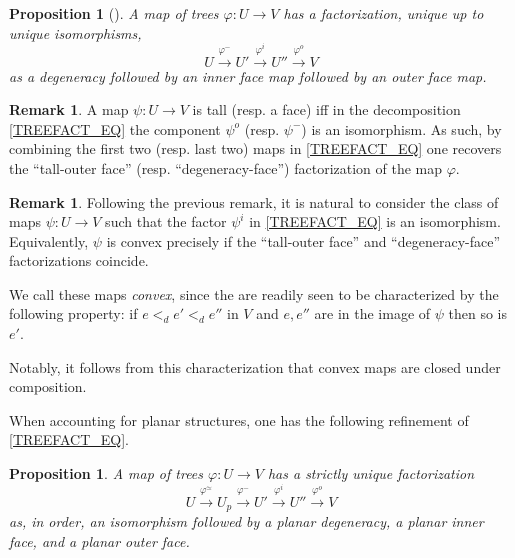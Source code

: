 \documentclass[a4paper,10pt
,draft
]{article}%
\numberwithin{equation}{section}
\numberwithin{figure}{section}
\newtheorem{proposition}[equation]{Proposition}%
\theoremstyle{definition} %
\newtheorem{remark}[equation]{Remark}%
\newcommand{\1}{\ensuremath{\mathbbm 1}}%
\begin{document}
\begin{proposition}[{\cite[Prop. 2.2]{BP_edss}}]
      \label{TREEFACT_PROP}
	A map of trees $\varphi \colon U \to V$ has a factorization, unique up to unique isomorphisms,
\begin{equation}\label{TREEFACT_EQ}
	U \xrightarrow{\varphi^-} 
	U' \xrightarrow{\varphi^i} 
	U'' \xrightarrow{\varphi^o} V
\end{equation}
	as a degeneracy followed by an inner face map followed by an outer face map.
\end{proposition}


\begin{remark}\label{TODF REM}
	A map $\psi \colon U \to V$
	is tall (resp. a face)
	iff in the decomposition \eqref{TREEFACT_EQ}
	the component $\psi^o$ (resp. $\psi^-$)
	is an isomorphism.
	As such, by combining the 
	first two (resp. last two)
	maps in \eqref{TREEFACT_EQ}
	one recovers the 
	``tall-outer face'' 
	(resp. ``degeneracy-face'')
	factorization of the map $\varphi$.
\end{remark}


\begin{remark}\label{CNVXM REM}
	Following the previous remark, 
	it is natural to consider the class of maps
	$\psi \colon U \to V$ such that
	the factor $\psi^i$ in \eqref{TREEFACT_EQ}
	is an isomorphism.
	Equivalently, $\psi$ is convex precisely if
	the ``tall-outer face'' and ``degeneracy-face''
	factorizations coincide.
	
	We call these maps \textit{convex},
	since the are readily seen to be 
	characterized by the following property:
	if $e <_d e' <_d e''$
	in $V$ and $e,e''$ are in the image of $\psi$
	then so is $e'$.
	
	Notably, it follows from this characterization that convex maps are closed under composition.
\end{remark}


When accounting for planar structures,
one has the following refinement of \eqref{TREEFACT_EQ}.

\begin{proposition}
      A map of trees $\varphi \colon U \to V$ has a strictly unique factorization
      \begin{equation}
            \label{OMEGAFACT_EQ}
            U \xrightarrow{\varphi^{\simeq}} U_p \xrightarrow{\varphi^-} U' \xrightarrow{\varphi^i} U'' \xrightarrow{\varphi^o} V            
      \end{equation}
      as, in order, an isomorphism followed by
      a planar degeneracy, a planar inner face, and a planar outer face.
\end{proposition}
\end{document}
